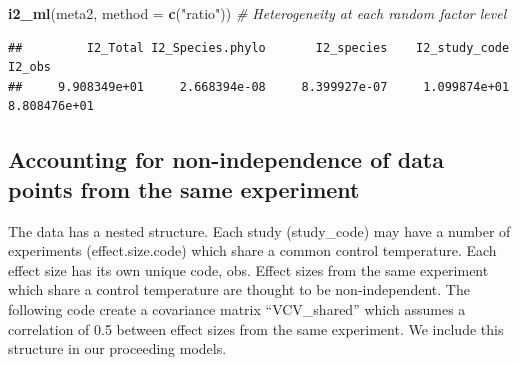 \documentclass[
]{article}
\newenvironment{Shaded}{\begin{snugshade}}{\end{snugshade}}
\newcommand{\AttributeTok}[1]{\textcolor[rgb]{0.13,0.29,0.53}{#1}}
\newcommand{\CommentTok}[1]{\textcolor[rgb]{0.56,0.35,0.01}{\textit{#1}}}
\newcommand{\FloatTok}[1]{\textcolor[rgb]{0.00,0.00,0.81}{#1}}
\newcommand{\FunctionTok}[1]{\textcolor[rgb]{0.13,0.29,0.53}{\textbf{#1}}}
\newcommand{\NormalTok}[1]{#1}
\newcommand{\OtherTok}[1]{\textcolor[rgb]{0.56,0.35,0.01}{#1}}
\newcommand{\SpecialCharTok}[1]{\textcolor[rgb]{0.81,0.36,0.00}{\textbf{#1}}}
\newcommand{\StringTok}[1]{\textcolor[rgb]{0.31,0.60,0.02}{#1}}
\begin{document}
\begin{Shaded}
\begin{Highlighting}[]
\FunctionTok{i2\_ml}\NormalTok{(meta2, }\AttributeTok{method =} \FunctionTok{c}\NormalTok{(}\StringTok{"ratio"}\NormalTok{))  }\CommentTok{\# Heterogeneity at each random factor level}
\end{Highlighting}
\end{Shaded}

\begin{verbatim}
##         I2_Total I2_Species.phylo       I2_species    I2_study_code           I2_obs 
##     9.908349e+01     2.668394e-08     8.399927e-07     1.099874e+01     8.808476e+01
\end{verbatim}

\hypertarget{accounting-for-non-independence-of-data-points-from-the-same-experiment}{%
\subsection{Accounting for non-independence of data points from the same
experiment}\label{accounting-for-non-independence-of-data-points-from-the-same-experiment}}

The data has a nested structure. Each study (study\_code) may have a
number of experiments (effect.size.code) which share a common control
temperature. Each effect size has its own unique code, obs. Effect sizes
from the same experiment which share a control temperature are thought
to be non-independent. The following code create a covariance matrix
``VCV\_shared'' which assumes a correlation of 0.5 between effect sizes
from the same experiment. We include this structure in our proceeding
models.

\begin{Shaded}
\end{Shaded}
\end{document}
